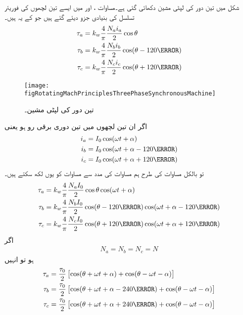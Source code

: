 شکل   میں تین دور کی لپٹی مشین دکھائی گئی ہے۔مساوات  ،   اور   میں ایسے تین لچھوں کی فوریئر تسلسل کی بنیادی جزو دیئے گئے ہیں جو کے یہ ہیں۔
\begin{gather}
\begin{aligned}\label{مساوات_گھومتے_مشین_تین_دباو_الف}
\tau_a&=k_w \frac{4}{\pi}\frac{N_a i_a}{2}\cos \theta\\
\tau_b&=k_w \frac{4}{\pi}\frac{N_b i_b}{2}\cos (\theta-120\degree)\\
\tau_c&=k_w \frac{4}{\pi}\frac{N_c i_c}{2}\cos (\theta+120\degree)
\end{aligned}
\end{gather}
%
\begin{figure}
\centering
\texttt{[image: figRotatingMachPrinciplesThreePhaseSynchronousMachine]}
\caption{تین دور کی لپٹی مشین۔}
\label{شکل_گھومتے_مشین_تین_دور_کے_لئے_لپٹی}
\end{figure}
اگر ان تین لچھوں میں تین دوری برقی رو ہو یعنی
\begin{gather}
\begin{aligned}\label{مساوات_گھومتے_مشین_تین_برقی_رو}
i_a&=I_0 \cos (\omega t+\alpha)\\
i_b&=I_0 \cos (\omega t +\alpha -120\degree)\\
i_c&=I_0 \cos (\omega t +\alpha +120\degree)
\end{aligned}
\end{gather}
تو بالکل مساوات  کی طرح ہم مساوات   کی مدد سے مساوات  کو یوں لکھ سکتے ہیں۔
\begin{gather}
\begin{aligned}
\tau_a&=k_w \frac{4}{\pi}\frac{N_a I_0}{2} \cos \theta \cos (\omega t +\alpha)\\
\tau_b&=k_w \frac{4}{\pi}\frac{N_b I_0}{2} \cos (\theta -120\degree)\cos (\omega t +\alpha -120\degree)\\
\tau_c&=k_w \frac{4}{\pi}\frac{N_c I_0}{2} \cos (\theta +120\degree)\cos (\omega t +\alpha +120\degree)
\end{aligned}
\end{gather}
اگر
\begin{align*}
N_a=N_b=N_c=N
\end{align*}
ہو تو انہیں
\begin{gather}
\begin{aligned}\label{مساوات_تبادلہ_تین_گھومتے_دباو}
\tau_a&=\frac{\tau_0}{2} \left[\cos (\theta +\omega t +\alpha) +\cos (\theta -\omega t -\alpha) \right]\\
\tau_b&=\frac{\tau_0}{2} \left[\cos (\theta +\omega t +\alpha-240\degree) +\cos (\theta -\omega t -\alpha) \right]\\
\tau_c&=\frac{\tau_0}{2} \left[\cos (\theta +\omega t +\alpha+240\degree) +\cos (\theta -\omega t -\alpha) \right]
\end{aligned}
\end{gather}

